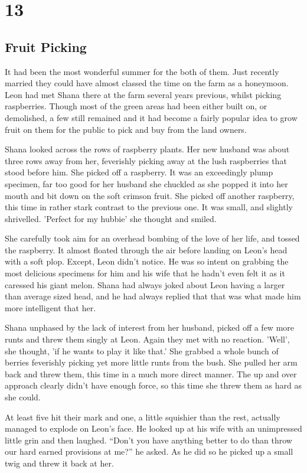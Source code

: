 \chapter{13}
\section{Fruit Picking}


It had been the most wonderful summer for the both of them.  Just recently married they could have almost classed the time on the farm as a honeymoon.  Leon had met Shana there at the farm several years previous, whilst picking raspberries.  Though most of the green areas had been either built on, or demolished, a few still remained and it had become a fairly popular idea to grow fruit on them for the public to pick and buy from the land owners.  

Shana looked across the rows of raspberry plants.  Her new husband was about three rows away from her, feverishly picking away at the lush raspberries that stood before him.  She picked off a raspberry.  It was an exceedingly plump specimen, far too good for her husband she chuckled as she popped it into her mouth and bit down on the soft crimson fruit.  She picked off another raspberry, this time in rather stark contrast to the previous one.  It was small, and slightly shrivelled.  'Perfect for my hubbie' she thought and smiled.

She carefully took aim for an overhead bombing of the love of her life, and tossed the raspberry.  It almost floated through the air before landing on Leon's head with a soft plop.  Except, Leon didn't notice.  He was so intent on grabbing the most delicious specimens for him and his wife that he hadn't even felt it as it caressed his giant melon.  Shana had always joked about Leon having a larger than average sized head, and he had always replied that that was what made him more intelligent that her.

Shana unphased by the lack of interest from her husband, picked off a few more runts and threw them singly at Leon.  Again they met with no reaction.  'Well', she thought, 'if he wants to play it like that.'   She grabbed a whole bunch of berries feverishly picking yet more little runts from the bush.  She pulled her arm back and threw them, this time in a much more direct manner.  The up and over approach clearly didn't have enough force, so this time she threw them as hard as she could.  

At least five hit their mark and one, a little squishier than the rest, actually managed to explode on Leon's face.  He looked up at his wife with an unimpressed little grin and then laughed.  ``Don't you have anything better to do than throw our hard earned provisions at me?'' he asked.  As he did so he picked up a small twig and threw it back at her.

